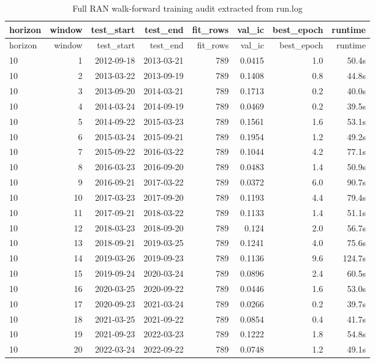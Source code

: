 \documentclass[10pt]{article}
\begin{document}
\begingroup\scriptsize\setlength{\tabcolsep}{3pt}
\begin{longtable}{lrrrrrrr}
\caption{Full RAN walk-forward training audit extracted from run.log}\label{tab:wfaudit}\\
\toprule
horizon & window & test\_start & test\_end & fit\_rows & val\_ic & best\_epoch & runtime \\
\midrule
\endfirsthead
\toprule
horizon & window & test\_start & test\_end & fit\_rows & val\_ic & best\_epoch & runtime \\
\midrule
\endhead
10 & 1 & 2012-09-18 & 2013-03-21 & 789 & 0.0415 & 1.0 & 50.4s \\
10 & 2 & 2013-03-22 & 2013-09-19 & 789 & 0.1408 & 0.8 & 44.8s \\
10 & 3 & 2013-09-20 & 2014-03-21 & 789 & 0.1713 & 0.2 & 40.0s \\
10 & 4 & 2014-03-24 & 2014-09-19 & 789 & 0.0469 & 0.2 & 39.5s \\
10 & 5 & 2014-09-22 & 2015-03-23 & 789 & 0.1561 & 1.6 & 53.1s \\
10 & 6 & 2015-03-24 & 2015-09-21 & 789 & 0.1954 & 1.2 & 49.2s \\
10 & 7 & 2015-09-22 & 2016-03-22 & 789 & 0.1044 & 4.2 & 77.1s \\
10 & 8 & 2016-03-23 & 2016-09-20 & 789 & 0.0483 & 1.4 & 50.9s \\
10 & 9 & 2016-09-21 & 2017-03-22 & 789 & 0.0372 & 6.0 & 90.7s \\
10 & 10 & 2017-03-23 & 2017-09-20 & 789 & 0.1193 & 4.4 & 79.4s \\
10 & 11 & 2017-09-21 & 2018-03-22 & 789 & 0.1133 & 1.4 & 51.1s \\
10 & 12 & 2018-03-23 & 2018-09-20 & 789 & 0.124 & 2.0 & 56.7s \\
10 & 13 & 2018-09-21 & 2019-03-25 & 789 & 0.1241 & 4.0 & 75.6s \\
10 & 14 & 2019-03-26 & 2019-09-23 & 789 & 0.1136 & 9.6 & 124.7s \\
10 & 15 & 2019-09-24 & 2020-03-24 & 789 & 0.0896 & 2.4 & 60.5s \\
10 & 16 & 2020-03-25 & 2020-09-22 & 789 & 0.0446 & 1.6 & 53.0s \\
10 & 17 & 2020-09-23 & 2021-03-24 & 789 & 0.0266 & 0.2 & 39.7s \\
10 & 18 & 2021-03-25 & 2021-09-22 & 789 & 0.0854 & 0.4 & 41.7s \\
10 & 19 & 2021-09-23 & 2022-03-23 & 789 & 0.1222 & 1.8 & 54.8s \\
10 & 20 & 2022-03-24 & 2022-09-22 & 789 & 0.0748 & 1.2 & 49.1s \\

\end{longtable}
\end{document}

